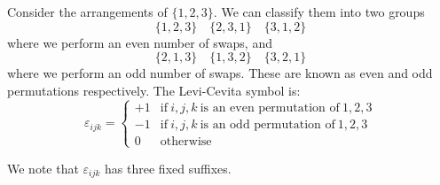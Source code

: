 \documentclass{article}
\numberwithin{equation}{section}
\begin{document}
\begin{defi}
    Consider the arrangements of $\{1, 2, 3\}$. We can classify them into two groups
    \[
        \{1, 2, 3\} \quad \{2, 3, 1\} \quad \{3, 1, 2\}
    \]
    where we perform an even number of swaps, and 
    \[
        \{2, 1, 3\} \quad \{1, 3, 2\} \quad \{3, 2, 1\}
    \]
    where we perform an odd number of swaps. These are known as even and odd permutations respectively. The Levi-Cevita symbol is:
    \[
        \varepsilon_{ijk} = \begin{cases}
            +1 & \text{if} \ i, j, k \ \text{is an even permutation of} \ 1, 2, 3 \\
            -1 & \text{if} \ i, j, k \ \text{is an odd permutation of} \ 1, 2, 3 \\
            0 & \text{otherwise}
        \end{cases}
    \]

    We note that $\varepsilon_{ijk}$ has three fixed suffixes.
\end{defi}
\end{document}
